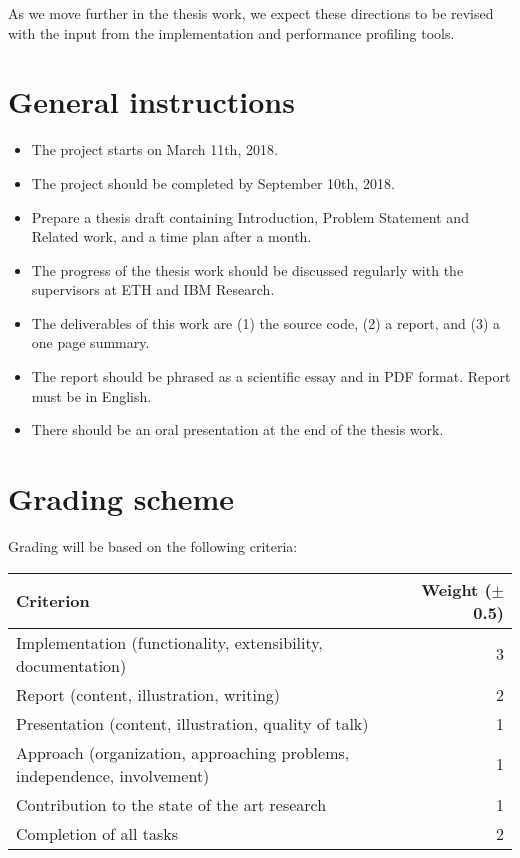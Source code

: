 \documentclass[10pt,a4paper]{article}
\begin{document}
As we move further in the thesis work, we expect these directions to be 
revised with the input from the implementation and performance profiling
tools.  

\section*{General instructions}

\begin{itemize} 
  
  \item The project starts on March 11th, 2018.
  
  \item The project should be completed by September 10th, 2018.

  \item Prepare a thesis draft containing Introduction, Problem Statement and
  Related work, and a time plan after a month.
  
  \item The progress of the thesis work should be discussed regularly with
  the supervisors at ETH and IBM Research.
  
  \item The deliverables of this work are (1) the source code, (2) a
  report, and (3) a one page summary.
  
  \item The report should be phrased as a scientific essay and in PDF format.
  Report must be in English. 
  
  \item There should be an oral presentation at the end of the thesis
  work.
  
\end{itemize}


\section*{Grading scheme}

Grading will be based on the following criteria:

\begin{center}
\begin{tabular}{lr}
\toprule
Criterion & Weight ($\pm$ 0.5) \\
\midrule
Implementation (functionality, extensibility, documentation) & 3 \\
Report (content, illustration, writing) & 2 \\
Presentation (content, illustration, quality of talk) & 1 \\
Approach (organization, approaching problems, independence, involvement) & 1
\\
Contribution to the state of the art research & 1 \\
Completion of all tasks & 2 \\
\bottomrule
\end{tabular}
\end{center}
\end{document}
